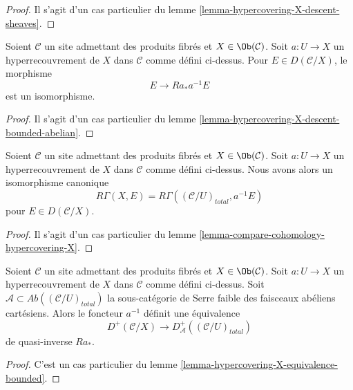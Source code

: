 \begin{proof}
Il s'agit d'un cas particulier du lemme
\ref{lemma-hypercovering-X-descent-sheaves}.
\end{proof}

\begin{lemma}
\label{lemma-hypercovering-X-simple-descent-bounded-abelian}
Soient $\mathcal{C}$ un site admettant des produits fibrés et $X \in \Ob(\mathcal{C})$.
Soit $a : U \to X$ un hyperrecouvrement de $X$ dans $\mathcal{C}$ comme défini ci-dessus.
Pour $E \in D(\mathcal{C}/X)$, le morphisme
$$
E \longrightarrow Ra_*a^{-1}E
$$
est un isomorphisme.
\end{lemma}

\begin{proof}
Il s'agit d'un cas particulier du lemme
\ref{lemma-hypercovering-X-descent-bounded-abelian}.
\end{proof}

\begin{lemma}
\label{lemma-compare-cohomology-hypercovering-X-simple}
Soient $\mathcal{C}$ un site admettant des produits fibrés et $X \in \Ob(\mathcal{C})$.
Soit $a : U \to X$ un hyperrecouvrement de $X$ dans $\mathcal{C}$ comme défini ci-dessus.
Nous avons alors un isomorphisme canonique
$$
R\Gamma(X, E) = R\Gamma((\mathcal{C}/U)_{total}, a^{-1}E)
$$
pour $E \in D(\mathcal{C}/X)$.
\end{lemma}

\begin{proof}
Il s'agit d'un cas particulier du lemme
\ref{lemma-compare-cohomology-hypercovering-X}.
\end{proof}

\begin{lemma}
\label{lemma-hypercovering-X-simple-equivalence-bounded}
Soient $\mathcal{C}$ un site admettant des produits fibrés et $X \in \Ob(\mathcal{C})$.
Soit $a : U \to X$ un hyperrecouvrement de $X$ dans $\mathcal{C}$ comme défini ci-dessus.
Soit $\mathcal{A} \subset \textit{Ab}((\mathcal{C}/U)_{total})$
la sous-catégorie de Serre faible des faisceaux abéliens cartésiens.
Alors le foncteur $a^{-1}$ définit une équivalence
$$
D^+(\mathcal{C}/X) \longrightarrow D_\mathcal{A}^+((\mathcal{C}/U)_{total})
$$
de quasi-inverse $Ra_*$.
\end{lemma}

\begin{proof}
C'est un cas particulier du
lemme \ref{lemma-hypercovering-X-equivalence-bounded}.
\end{proof}

